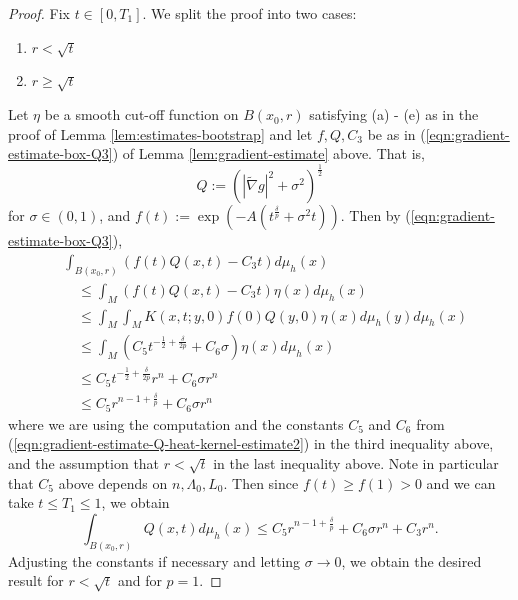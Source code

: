\documentclass[12pt]{amsart}
\theoremstyle{plain}
\theoremstyle{plain}
\theoremstyle{definition}
\theoremstyle{remark}
\numberwithin{equation}{subsection}
\newcommand{\hdel}{\tilde{\nabla}}
\begin{document}
\begin{proof}
    Fix $t \in [0, T_1]$. We split the proof into two cases:
    \begin{enumerate}[(1)]
        \item $r < \sqrt{t}$
        \item $r \geq \sqrt{t}$
    \end{enumerate}

    Let $\eta$ be a smooth cut-off function on $B(x_0, r)$ satisfying (a) - (e) as in the proof of Lemma \ref{lem:estimates-bootstrap} and let $f, Q, C_3$ be as in (\ref{eqn:gradient-estimate-box-Q3}) of Lemma \ref{lem:gradient-estimate} above. That is,
    \begin{equation*}
        Q := \left(|\hdel g|^2 + \sigma^2\right)^\frac{1}{2}
    \end{equation*}
    for $\sigma \in (0,1)$, and $f(t) := \exp\left(-A(t^\frac{\delta}{p}+\sigma^2t)\right)$. Then by (\ref{eqn:gradient-estimate-box-Q3}),
    \begin{align*}
        &\int_{B(x_0,r)} \left(f(t)Q(x,t)-C_3t\right)d\mu_h(x) \nonumber \\
        &\quad\leq \int_M \left(f(t)Q(x,t)-C_3t\right)\eta(x)d\mu_h(x) \nonumber \\
        &\quad\leq \int_M \int_M K(x,t;y,0)f(0)Q(y,0)\eta(x)d\mu_h(y)d\mu_h(x) \nonumber \\
        &\quad\leq \int_M \left(C_5t^{-\frac{1}{2}+\frac{\delta}{2p}}+C_6\sigma\right)\eta(x)d\mu_h(x) \nonumber \\
        &\quad\leq C_5t^{-\frac{1}{2}+\frac{\delta}{2p}}r^n + C_6\sigma r^n \nonumber \\
        &\quad\leq C_5r^{n-1+\frac{\delta}{p}} + C_6\sigma r^n
    \end{align*}
    where we are using the computation and the constants $C_5$ and $C_6$ from (\ref{eqn:gradient-estimate-Q-heat-kernel-estimate2}) in the third inequality above, and the assumption that $r < \sqrt{t}$ in the last inequality above. Note in particular that $C_5$ above depends on $n, \Lambda_0, L_0$. Then since $f(t) \geq f(1) > 0$ and we can take $t \leq T_1 \leq 1$, we obtain
    \begin{equation*}
        \int_{B(x_0,r)} Q(x,t)d\mu_h(x) \leq C_5r^{n-1+\frac{\delta}{p}} + C_6\sigma r^n + C_3r^n.
    \end{equation*}
    Adjusting the constants if necessary and letting $\sigma \to 0$, we obtain the desired result for $r < \sqrt{t}$ and for $p = 1$.


\end{proof}
\end{document}
